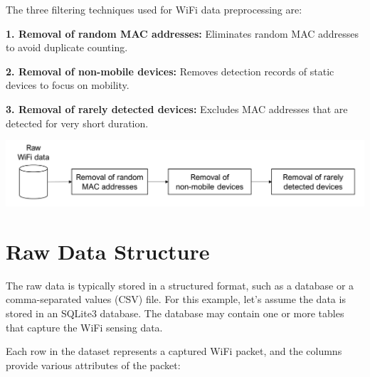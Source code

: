 \documentclass[
  letterpaper,
]{scrbook}
\begin{document}
The three filtering techniques used for WiFi data preprocessing are:

\textbf{1. Removal of random MAC addresses:} Eliminates random MAC
addresses to avoid duplicate counting.

\textbf{2. Removal of non-mobile devices:} Removes detection records of
static devices to focus on mobility.

\textbf{3. Removal of rarely detected devices:} Excludes MAC addresses
that are detected for very short duration.

\includegraphics{content/material/ch3/preprocessing.png}

\section{Raw Data Structure}\label{raw-data-structure}

The raw data is typically stored in a structured format, such as a
database or a comma-separated values (CSV) file. For this example, let's
assume the data is stored in an SQLite3 database. The database may
contain one or more tables that capture the WiFi sensing data.

Each row in the dataset represents a captured WiFi packet, and the
columns provide various attributes of the packet:
\end{document}
